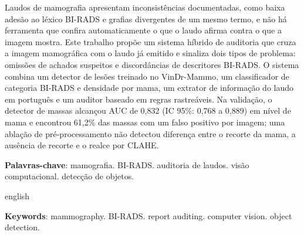 
\setlength{\absparsep}{18pt}
\begin{resumo}
Laudos de mamografia apresentam inconsistências documentadas, como baixa adesão ao léxico BI-RADS e grafias divergentes de um mesmo termo, e não há ferramenta que confira automaticamente o que o laudo afirma contra o que a imagem mostra. Este trabalho propõe um sistema híbrido de auditoria que cruza a imagem mamográfica com o laudo já emitido e sinaliza dois tipos de problema: omissões de achados suspeitos e discordâncias de descritores BI-RADS. O sistema combina um detector de lesões treinado no VinDr-Mammo, um classificador de categoria BI-RADS e densidade por mama, um extrator de informação do laudo em português e um auditor baseado em regras rastreáveis. Na validação, o detector de massas alcançou AUC de 0,832 (IC 95\%: 0,768 a 0,889) em nível de mama e encontrou 61,2\% das massas com um falso positivo por imagem; uma ablação de pré-processamento não detectou diferença entre o recorte da mama, a ausência de recorte e o realce por CLAHE. 

\textbf{Palavras-chave}: mamografia. BI-RADS. auditoria de laudos. visão computacional. detecção de objetos.
\end{resumo}

\begin{resumo}[Abstract]
\begin{otherlanguage*}{english}

\vspace{\onelineskip}
\noindent
\textbf{Keywords}: mammography. BI-RADS. report auditing. computer vision. object detection.
\end{otherlanguage*}
\end{resumo}
